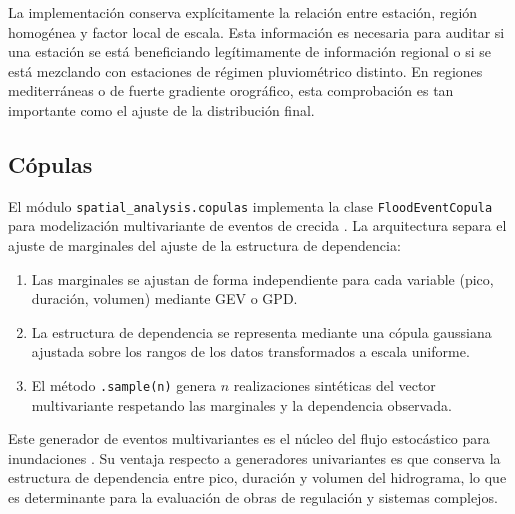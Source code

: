 La implementación conserva explícitamente la relación entre estación, región homogénea y factor local de escala. Esta información es necesaria para auditar si una estación se está beneficiando legítimamente de información regional o si se está mezclando con estaciones de régimen pluviométrico distinto. En regiones mediterráneas o de fuerte gradiente orográfico, esta comprobación es tan importante como el ajuste de la distribución final.

\subsection{Cópulas}

El módulo \texttt{spatial\_analysis.copulas} implementa la clase \texttt{FloodEventCopula} para modelización multivariante de eventos de crecida \parencite{genest2007copulas,salvadori2007extremes}. La arquitectura separa el ajuste de marginales del ajuste de la estructura de dependencia:
\begin{enumerate}
  \item Las marginales se ajustan de forma independiente para cada variable (pico, duración, volumen) mediante GEV o GPD.
  \item La estructura de dependencia se representa mediante una cópula gaussiana ajustada sobre los rangos de los datos transformados a escala uniforme.
  \item El método \texttt{.sample(n)} genera $n$ realizaciones sintéticas del vector multivariante respetando las marginales y la dependencia observada.
\end{enumerate}

Este generador de eventos multivariantes es el núcleo del flujo estocástico para inundaciones \parencite{navas2018besaya,navas2019mallorca,navas2024calle30}. Su ventaja respecto a generadores univariantes es que conserva la estructura de dependencia entre pico, duración y volumen del hidrograma, lo que es determinante para la evaluación de obras de regulación y sistemas complejos.


